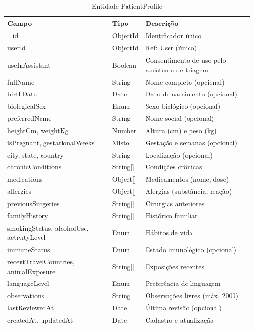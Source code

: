 \begin{table}[H]
  \centering
  \caption{Entidade PatientProfile}
  \label{tab:entity-patient-profile}
  \begin{tabular}{p{3.8cm}p{2.5cm}p{5.2cm}}
    \toprule
    \textbf{Campo} &
    \textbf{Tipo} &
    \textbf{Descrição} \\
    \midrule
    \_id                  & ObjectId & Identificador único \\
    userId                & ObjectId & Ref: User (único) \\
    useInAssistant        & Boolean  & Consentimento de uso
                                       pelo assistente de triagem \\
    fullName              & String   & Nome completo (opcional) \\
    birthDate             & Date     & Data de nascimento (opcional) \\
    biologicalSex         & Enum     & Sexo biológico (opcional) \\
    preferredName         & String   & Nome social (opcional) \\
    heightCm, weightKg    & Number   & Altura (cm) e peso (kg) \\
    isPregnant,
    gestationalWeeks      & Misto    & Gestação e semanas (opcional) \\
    city, state, country  & String   & Localização (opcional) \\
    chronicConditions     & String[] & Condições crônicas \\
    medications           & Object[] & Medicamentos (nome, dose) \\
    allergies             & Object[] & Alergias (substância, reação) \\
    previousSurgeries     & String[] & Cirurgias anteriores \\
    familyHistory         & String[] & Histórico familiar \\
    smokingStatus,
    alcoholUse,
    activityLevel         & Enum     & Hábitos de vida \\
    immuneStatus          & Enum     & Estado imunológico (opcional) \\
    recentTravelCountries,
    animalExposure        & String[] & Exposições recentes \\
    languageLevel         & Enum     & Preferência de linguagem \\
    observations          & String   & Observações livres (máx. 2000) \\
    lastReviewedAt        & Date     & Última revisão (opcional) \\
    createdAt, updatedAt  & Date     & Cadastro e atualização \\
    \bottomrule
  \end{tabular}
\end{table}

